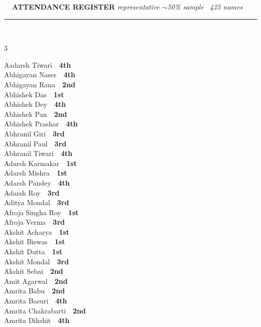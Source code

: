 \documentclass[11pt,a4paper]{article}
\begin{document}
\vspace{3pt}\noindent
{\footnotesize\bfseries\color{Slate}\faListOl~~ATTENDANCE REGISTER}%
\hfill{\scriptsize\itshape\color{Slate}representative $\sim$50\% sample \textperiodcentered\ 425 names}\\[3pt]
{\color{Line}\rule{\linewidth}{0.5pt}}\\[5pt]
\begingroup\footnotesize\setlength{\columnsep}{20pt}\setlength{\parskip}{1pt}%
\begin{multicols}{3}\raggedright
Aadarsh Tiwari~\dotfill~\textbf{4th}\\
Abhigayan Naser~\dotfill~\textbf{4th}\\
Abhigayan Rana~\dotfill~\textbf{2nd}\\
Abhishek Das~\dotfill~\textbf{1st}\\
Abhishek Dey~\dotfill~\textbf{4th}\\
Abhishek Pan~\dotfill~\textbf{2nd}\\
Abhishek Prashar~\dotfill~\textbf{4th}\\
Abhranil Giri~\dotfill~\textbf{3rd}\\
Abhranil Paul~\dotfill~\textbf{3rd}\\
Abhranil Tiwari~\dotfill~\textbf{4th}\\
Adarsh Karmakar~\dotfill~\textbf{1st}\\
Adarsh Mishra~\dotfill~\textbf{1st}\\
Adarsh Pandey~\dotfill~\textbf{4th}\\
Adarsh Roy~\dotfill~\textbf{3rd}\\
Aditya Mondal~\dotfill~\textbf{3rd}\\
Afroja Singha Roy~\dotfill~\textbf{1st}\\
Afroja Verma~\dotfill~\textbf{3rd}\\
Akshit Acharya~\dotfill~\textbf{1st}\\
Akshit Biswas~\dotfill~\textbf{1st}\\
Akshit Dutta~\dotfill~\textbf{1st}\\
Akshit Mondal~\dotfill~\textbf{3rd}\\
Akshit Sebai~\dotfill~\textbf{2nd}\\
Amit Agarwal~\dotfill~\textbf{2nd}\\
Amrita Babu~\dotfill~\textbf{2nd}\\
Amrita Basuri~\dotfill~\textbf{4th}\\
Amrita Chakrabarti~\dotfill~\textbf{2nd}\\
Amrita Dikshit~\dotfill~\textbf{4th}\\

\end{multicols}
\end{document}
